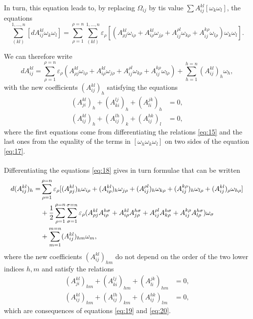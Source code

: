 \documentclass[leqno,12pt]{article}
\makeatletter
\let\old@epsilon\epsilon
\let\old@varepsilon\varepsilon
\let\epsilon\old@varepsilon
\let\varepsilon\old@epsilon
\theoremstyle{shape1}
\theoremstyle{shape0}
\theoremstyle{shape2}
\theoremstyle{definition}
\makeatother
\begin{document}
In turn, this equation leads to, by replacing $\Omega_{ij}$ by tis value $\sum A^{kl}_{ij}[\omega_{k}\omega_{l}]$, the equations
\begin{equation}
  \label{eq:17}
  \sum_{(kl)}^{1,\dots,n}[dA^{kl}_{ij}\omega_{k}\omega_{l}]=\sum_{\rho=1}^{\rho=n}\sum_{(kl)}^{1,\dots,n}\epsilon_{\rho}[(A^{kl}_{\rho j}\omega_{i\rho}+A^{kl}_{i\rho}\omega_{j\rho}+A^{\rho l}_{ij}\omega_{k\rho}+A^{k\rho}_{ij}\omega_{l\rho})\omega_{k}\omega_{l}].
\end{equation}

We can therefore write
\begin{equation}
  \label{eq:18}
  dA^{kl}_{ij}=\sum_{\rho=1}^{\rho=n}\epsilon_{\rho}(A^{kl}_{\rho j}\omega_{i\rho}+A^{kl}_{i\rho}\omega_{j\rho}+A^{\rho l}_{ij}\omega_{k\rho}+A^{k\rho}_{ij}\omega_{l\rho})+\sum_{h=1}^{h=n}(A^{kl}_{ij})_{h}\omega_{h},
\end{equation}
with the new coefficients $(A^{kl}_{ij})_{h}$ satisfying the equations
\begin{align}
  \label{eq:19}
  (A^{kl}_{ji})_{h}+(A^{lj}_{ki})_{h}+(A^{jk}_{li})_{h}&=0,\\
  \label{eq:20}
  (A^{kl}_{ij})_{h}+(A^{lh}_{ij})_{k}+(A^{hk}_{ij})_{l}&=0,
\end{align}
where the first equations come from differentiating the relations \eqref{eq:15} and the last ones from the equality of the terms in $[\omega_{h}\omega_{k}\omega_{l}]$ on two sides of the equation \eqref{eq:17}.

\paragraph{}
\label{sec:9}
Differentiating the equations \eqref{eq:18} gives in turn formulae that can be written
\begin{align}
  \label{eq:21}
  d(A^{kl}_{ij})_{h}=&{}\sum_{\rho=1}^{\rho=n}\epsilon_{\rho}[(A^{kl}_{\rho j})_{h}\omega_{i\rho}+(A^{kl}_{i\rho})_{h}\omega_{j\rho}+(A^{\rho l}_{ij})_{h}\omega_{k\rho}+(A^{k\rho}_{ij})_{h}\omega_{l\rho}+(A^{kl}_{ij})_{\rho}\omega_{h\rho}]\\
  &{}+\frac{1}{2}\sum_{\rho=1}^{\rho=n}\sum_{\sigma=1}^{\sigma=n}\epsilon_{\rho}(A_{\rho j}^{kl}A_{i\rho}^{h\sigma}+A_{i\rho}^{kl}A_{j\rho}^{h\sigma}+A_{ij}^{\rho l}A_{k\rho}^{h\sigma}+A_{ij}^{k\rho}A_{l\rho}^{h\sigma})\omega_{\sigma}\notag\\
  &{}+\sum_{m=1}^{m=n}(A_{ij}^{kl})_{hm}\omega_{m},\notag
\end{align}
where the new coefficients $(A^{kl}_{ij})_{hm}$ do not depend on the order of the two lower indices $h,m$ and satisfy the relations
\begin{align}
  \label{eq:22}
  (A^{kl}_{ji})_{hm}+(A^{lj}_{ki})_{hm}+(A^{jk}_{li})_{hm}&=0,\\
  \label{eq:23}  
  (A^{kl}_{ij})_{hm}+(A^{lh}_{ij})_{km}+(A^{hk}_{ij})_{lm}&=0,
\end{align}
which are consequences of equations \eqref{eq:19} and \eqref{eq:20}.
\end{document}
